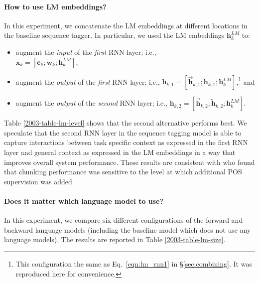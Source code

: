 \documentclass[11pt,a4paper]{article}
\begin{document}
\paragraph{How to use LM embeddings?}
In this experiment, we concatenate the LM embeddings at different locations in the baseline sequence tagger.
In particular, we used the LM embeddings $\mathbf{h}_k^{LM}$ to:
\begin{itemize}
\item augment the \textit{input} of the \textit{first} RNN layer; i.e., \\
$\mathbf{x}_k  = [\mathbf{c}_k; \mathbf{w}_k; \mathbf{h}_k^{LM}]$,
\item augment
the \textit{output} of the \textit{first} RNN layer; i.e.,
$\mathbf{h}_{k,1} = [\overrightarrow{\mathbf{h}}_{k,1}; \overleftarrow{\mathbf{h}}_{k,1}; \mathbf{h}_k^{LM}]$,\footnote{This configuration the same as Eq.~\ref{eqn:lm_rnn1} in \S\ref{sec:combining}. It was reproduced here for convenience.} and
\item augment the \textit{output} of the \textit{second} RNN layer; i.e., $\mathbf{h}_{k,2}  = [\overrightarrow{\mathbf{h}}_{k,2}; \overleftarrow{\mathbf{h}}_{k,2}; \mathbf{h}_k^{LM}]$.
\end{itemize}

Table \ref{2003-table-lm-level} shows that the second alternative
performs best.
We speculate that the second RNN layer in the sequence tagging
model is able to capture interactions between task specific context as
expressed in the first RNN layer and general context as expressed in the LM
embeddings in a way that improves overall
system performance.  These results are consistent with \citet{Sgaard2016DeepML} who found that chunking performance was sensitive
to the level at which additional POS supervision was added.




\paragraph{Does it matter which language model to use?} In this experiment, we compare six different configurations of the forward and backward language models (including the baseline model which does not use any language models).
The results are reported in Table \ref{2003-table-lm-size}.
\end{document}
